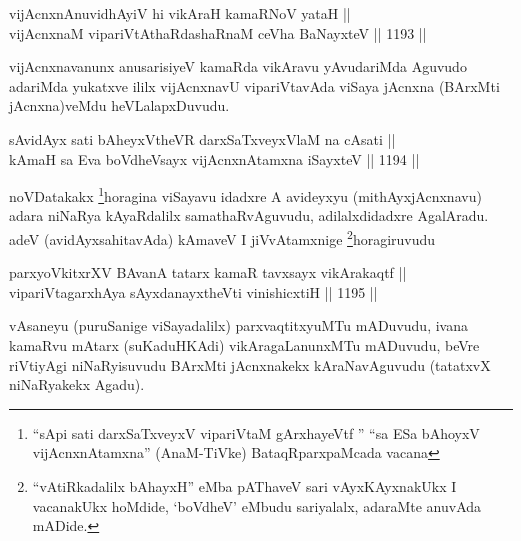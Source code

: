 \begin{shl}
vijAcnxnAnuvidhAyiV hi vikAraH kamaRNoV yataH || \\
\footnotemark[1]vijAcnxnaM vipariVtAthaRdashaRnaM ceVha BaNayxteV \hfill || 1193 ||  
\end{shl}

\begin{artha}
vijAcnxnavanunx anusarisiyeV kamaRda vikAravu yAvudariMda Aguvudo adariMda yukatxve ililx vijAcnxnavU vipariVtavAda viSaya jAcnxna (BArxMti jAcnxna)veMdu heVLalapxDuvudu.
\end{artha}

\begin{shl}
sA\s vidAyx sati bAheyxV\s theVR darxSaTxveyxV\s laM na cAsati || \\
kAmaH sa Eva boVdheV\s sayx vijAcnxnAtamxna iSayxteV \hfill || 1194 ||  
\end{shl}

\begin{artha}
noVDatakakx \footnote{``sA\s pi sati darxSaTxveyxV vipariVtaM gArxhayeVtf '' ``sa ESa bAhoyxV vijAcnxnAtamxna'' (AnaM-TiVke) BataqRparxpaMcada vacana}horagina viSayavu idadxre A avideyxyu (mithAyxjAcnxnavu) adara niNaRya kAyaRdalilx samathaRvAguvudu, adilalxdidadxre AgalAradu. adeV (avidAyxsahitavAda) kAmaveV I jiVvAtamxnige \footnote{``vAtiRkadalilx bAhayxH'' eMba pAThaveV sari vAyxKAyxnakUkx I vacanakUkx hoMdide, `boVdheV' eMbudu sariyalalx, adaraMte anuvAda mADide.}horagiruvudu
\end{artha}

\begin{shl}
\footnotemark[2]parxyoVkitxrXV BAvanA tatarx kamaR tavxsayx vikArakaqtf || \\
vipariVtagarxhAya sAyxdanayxtheVti vinishicxtiH \hfill || 1195 ||
\end{shl}

\begin{artha}
vAsaneyu (puruSanige viSayadalilx) parxvaqtitxyuMTu mADuvudu, ivana kamaRvu mAtarx (suKaduHKAdi) vikAragaLanunxMTu mADuvudu, beVre riVtiyAgi niNaRyisuvudu BArxMti jAcnxnakekx kAraNavAguvudu (tatatxvX niNaRyakekx Agadu).
\end{artha}


